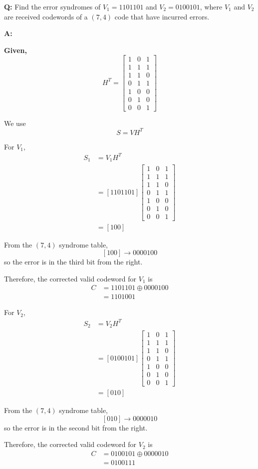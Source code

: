 \documentclass[11pt,a4paper]{book}
\newcounter{qna}[chapter]
\renewcommand{\theqna}{\thechapter.\arabic{qna}}
\newenvironment{questionanswerbox}[1][Example]{%
    \refstepcounter{qna}
    \begin{tcolorbox}[
        enhanced,
        breakable,
        colback=softlavender!10,
        colframe=softlavender!200,
        title={#1~\theqna},
        fonttitle=\bfseries,
        coltitle=white,
        colbacktitle=softlavender!200,
        sharp corners,
        boxrule=1pt,
        left=8pt,
        right=8pt,
        top=6pt,
        bottom=6pt
    ]
}{\end{tcolorbox}}
\begin{document}
\begin{questionanswerbox}[Finding Error Syndromes of Received Words Example]
\textbf{Q:} Find the error syndromes of \(V_1=1101101\) and \(V_2=0100101\), where \(V_1\) and \(V_2\) are received codewords of a \((7,4)\) code that have incurred errors.

\textbf{A:}

\textbf{Given,}
\[
H^T=
\begin{bmatrix}
1&0&1\\
1&1&1\\
1&1&0\\
0&1&1\\
1&0&0\\
0&1&0\\
0&0&1
\end{bmatrix}
\]

We use
\[
S=VH^T
\]

For \(V_1\),
\begin{align*}
S_1 &= V_1H^T\\
    &= [1101101]
\begin{bmatrix}
1&0&1\\
1&1&1\\
1&1&0\\
0&1&1\\
1&0&0\\
0&1&0\\
0&0&1
\end{bmatrix}\\
    &= [100]
\end{align*}

From the \((7,4)\) syndrome table,
\[
[100]\longrightarrow 0000100
\]
so the error is in the third bit from the right.

Therefore, the corrected valid codeword for \(V_1\) is
\begin{align*}
C &= 1101101 \oplus 0000100\\
  &= 1101001
\end{align*}

For \(V_2\),
\begin{align*}
S_2 &= V_2H^T\\
    &= [0100101]
\begin{bmatrix}
1&0&1\\
1&1&1\\
1&1&0\\
0&1&1\\
1&0&0\\
0&1&0\\
0&0&1
\end{bmatrix}\\
    &= [010]
\end{align*}

From the \((7,4)\) syndrome table,
\[
[010]\longrightarrow 0000010
\]
so the error is in the second bit from the right.

Therefore, the corrected valid codeword for \(V_2\) is
\begin{align*}
C &= 0100101 \oplus 0000010\\
  &= 0100111
\end{align*}
\end{questionanswerbox}
\end{document}
